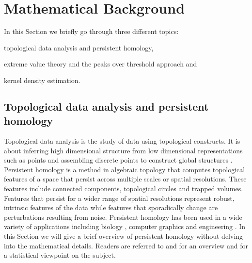 \documentclass[letter,12pt]{article}
\begin{document}
\section{Mathematical Background}\label{sec:methodology}
In this Section we briefly go through three different topics: \begin{inparaenum} \item topological data analysis and persistent homology, \item extreme value theory and the peaks over threshold approach and \item kernel density estimation. \end{inparaenum}  

\subsection{Topological data analysis and persistent homology}\label{subsec:tda}
Topological data analysis is the study of data using topological constructs. It is about inferring high dimensional structure from low dimensional representations such as points and assembling discrete points to construct global structures \citep{ghrist2008barcodes}. Persistent homology is a method in algebraic topology that computes topological features of a space that persist across multiple scales or spatial resolutions. These features include connected components, topological circles and trapped volumes.  Features that persist for a wider range of spatial resolutions represent robust, intrinsic features of the data while features that sporadically change are perturbations resulting from noise. Persistent homology has been used in a wide variety of applications including biology  \citep{topaz2015topological}, computer graphics \citep{carlsson2008local} and engineering \citep{perea2015sliding}. In this Section we will give a brief overview of persistent homology without delving into the mathematical details. Readers are referred to \cite{ghrist2008barcodes} and \cite{Carlsson2009} for an overview and \cite{wasserman2018topological} for a statistical viewpoint on the subject. 
\end{document}
